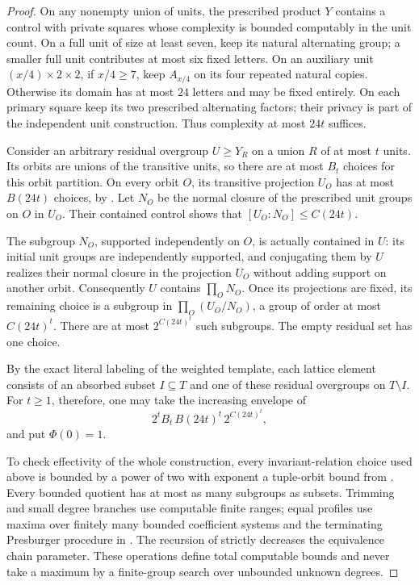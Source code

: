 \begin{proof}
On any nonempty union of units, the prescribed product $Y$
contains a control with private squares whose complexity is
bounded computably in the unit count.  On a full unit of size
at least seven, keep its natural alternating group; a smaller
full unit contributes at most six fixed letters.  On an
auxiliary unit $(x/4)\times2\times2$, if $x/4\ge7$, keep
$A_{x/4}$ on its four repeated natural copies.  Otherwise
its domain has at most $24$ letters and may be fixed entirely.
On each primary square keep its two prescribed alternating
factors; their privacy is part of the independent unit
construction.  Thus complexity at most $24t$ suffices.

Consider an arbitrary residual overgroup $U\ge Y_R$ on a
union $R$ of at most $t$ units.  Its orbits are unions of
the transitive units, so there are at most $B_t$ choices
for this orbit partition.  On every orbit $O$, its
transitive projection $U_O$ has at most $B(24t)$ choices,
by .  Let $N_O$ be the normal
closure of the prescribed unit groups on $O$ in $U_O$.
Their contained control shows that
$[U_O:N_O]\le C(24t)$.

The subgroup $N_O$, supported independently on $O$, is
actually contained in $U$: its initial unit groups are
independently supported, and conjugating them by $U$
realizes their normal closure in the projection $U_O$
without adding support on another orbit.  Consequently
$U$ contains $\prod_O N_O$.  Once its projections are
fixed, its remaining choice is a subgroup in
$\prod_O(U_O/N_O)$, a group of order at most
$C(24t)^t$.  There are at most $2^{C(24t)^t}$ such
subgroups.  The empty residual set has one choice.

By the exact literal labeling of the weighted template,
each lattice element consists of an absorbed subset
$I\subseteq T$ and one of these residual overgroups on
$T\setminus I$.  For $t\ge1$, therefore, one may take
the increasing envelope of
\begin{equation}\label{n:explicit-template-envelope}
 2^t B_t\,B(24t)^t\,2^{C(24t)^t},
\end{equation}
and put $\Phi(0)=1$.

To check effectivity of the whole construction, every
invariant-relation choice used above is bounded by a
power of two with exponent a tuple-orbit bound from
.  Every bounded quotient has at
most as many subgroups as subsets.  Trimming and small
degree branches use computable finite ranges; equal
profiles use maxima over finitely many bounded
coefficient systems and the terminating Presburger
procedure in .  The recursion of
 strictly decreases the equivalence
chain parameter.  These operations define total
computable bounds and never take a maximum by a
finite-group search over unbounded unknown degrees.
\end{proof}
